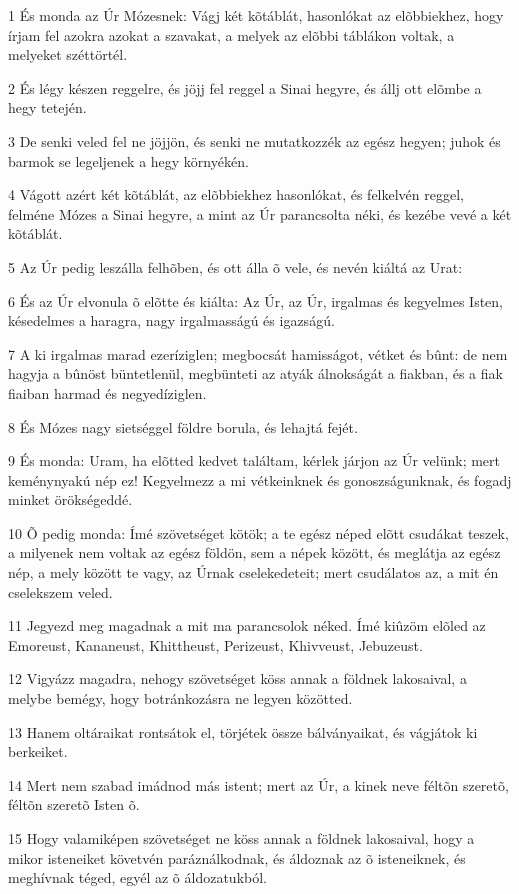 \par 1 És monda az Úr Mózesnek: Vágj két kõtáblát, hasonlókat az elõbbiekhez, hogy írjam fel azokra azokat a szavakat, a melyek az elõbbi táblákon voltak, a melyeket széttörtél.
\par 2 És légy készen reggelre, és jöjj fel reggel a Sinai hegyre, és állj ott elõmbe a hegy tetején.
\par 3 De senki veled fel ne jöjjön, és senki ne mutatkozzék az egész hegyen; juhok és barmok se legeljenek a hegy környékén.
\par 4 Vágott azért két kõtáblát, az elõbbiekhez hasonlókat, és felkelvén reggel, felméne Mózes a Sinai hegyre, a mint az Úr parancsolta néki, és kezébe vevé a két kõtáblát.
\par 5 Az Úr pedig leszálla felhõben, és ott álla õ vele, és nevén kiáltá az Urat:
\par 6 És az Úr elvonula õ elõtte és kiálta: Az Úr, az Úr, irgalmas és kegyelmes Isten, késedelmes a haragra, nagy irgalmasságú és igazságú.
\par 7 A ki irgalmas marad ezeríziglen; megbocsát hamisságot, vétket és bûnt: de nem hagyja a bûnöst  büntetlenül, megbünteti az atyák álnokságát a fiakban, és a fiak fiaiban harmad és negyedíziglen.
\par 8 És Mózes nagy sietséggel földre borula, és lehajtá fejét.
\par 9 És monda: Uram, ha elõtted kedvet találtam, kérlek járjon az Úr velünk; mert keménynyakú nép ez! Kegyelmezz a mi vétkeinknek és gonoszságunknak, és fogadj minket örökségeddé.
\par 10 Õ pedig monda: Ímé szövetséget kötök; a te egész néped elõtt csudákat teszek, a milyenek nem voltak az egész földön, sem a népek között, és meglátja az egész nép, a mely között te vagy, az Úrnak cselekedeteit; mert csudálatos az, a mit én cselekszem veled.
\par 11 Jegyezd meg magadnak a mit ma parancsolok néked. Ímé kiûzöm elõled az Emoreust, Kananeust, Khittheust, Perizeust, Khivveust, Jebuzeust.
\par 12 Vigyázz magadra, nehogy szövetséget köss annak a földnek lakosaival, a melybe bemégy, hogy botránkozásra ne legyen közötted.
\par 13 Hanem oltáraikat rontsátok el, törjétek össze bálványaikat, és vágjátok ki berkeiket.
\par 14 Mert nem szabad imádnod más istent; mert az Úr, a kinek neve féltõn szeretõ, féltõn szeretõ Isten õ.
\par 15 Hogy valamiképen szövetséget ne köss annak a földnek lakosaival, hogy a mikor isteneiket követvén paráználkodnak, és áldoznak az õ isteneiknek, és meghívnak téged, egyél az õ áldozatukból.
